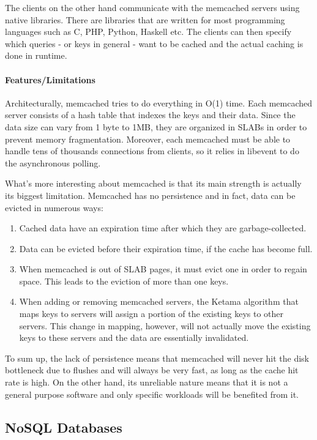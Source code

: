 The clients on the other hand communicate with the memcached servers using 
native libraries. There are libraries that are written for most programming 
languages such as C, PHP, Python, Haskell etc. The clients can then specify 
which queries - or keys in general - want to be cached and the actual caching 
is done in runtime.

\paragraph{Features/Limitations}

Architecturally, memcached tries to do everything in O(1) time. Each memcached 
server consists of a hash table that indexes the keys and their data. Since the 
data size can vary from 1 byte to 1MB, they are organized in SLABs in order to 
prevent memory fragmentation.  Moreover, each memcached must be able to handle 
tens of thousands connections from clients, so it relies in libevent to do the 
asynchronous polling.

What's more interesting about memcached is that its main strength is actually 
its biggest limitation. Memcached has no persistence and in fact, data can be 
evicted in numerous ways:

\begin{enumerate}
	\item Cached data have an expiration time after which they are 
		garbage-collected.
	\item Data can be evicted before their expiration time, if the cache has 
		become full.
	\item When memcached is out of SLAB pages, it must evict one in order to 
		regain space. This leads to the eviction of more than one keys.
	\item When adding or removing memcached servers, the Ketama algorithm that 
		maps keys to servers will assign a portion of the existing keys to 
		other servers. This change in mapping, however, will not actually move 
		the existing keys to these servers and the data are essentially 
		invalidated.
\end{enumerate}

To sum up, the lack of persistence means that memcached will never hit the disk 
bottleneck due to flushes and will always be very fast, as long as the cache 
hit rate is high. On the other hand, its unreliable nature means that it is not 
a general purpose software and only specific workloads will be benefited from 
it.

\subsection{NoSQL Databases}

